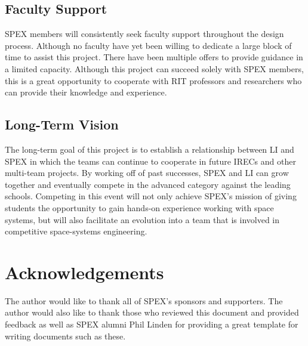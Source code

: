 \documentclass[conference]{IEEEtran} %
\begin{document}
\subsection{Faculty Support}
\label{subsec:Faculty Support}
SPEX members will consistently seek faculty support throughout the design process. Although no faculty have yet been willing to dedicate a
large block of time to assist this project. There have been multiple offers to provide guidance in a limited capacity. Although this project can succeed solely
with SPEX members, this is a great opportunity to cooperate with RIT professors and researchers who can provide their knowledge and experience.

\subsection{Long-Term Vision}
\label{sec:Long-Term Vision}
The long-term goal of this project is to establish a relationship between LI and SPEX in which the teams can continue to cooperate
in future IRECs and other multi-team projects. By working off of past successes, SPEX and LI can grow together and eventually compete in the
advanced category against the leading schools. Competing in this event will not only achieve SPEX's mission of giving students the opportunity to gain hands-on
experience working with space systems, but will also facilitate an evolution into a team that is involved in competitive space-systems engineering.

\section*{Acknowledgements}
\label{subsec:Acknoledgements}
The author would like to thank all of SPEX's sponsors and supporters. The author would also like to thank those who reviewed this document and provided feedback
as well as SPEX alumni Phil Linden for providing a great template for writing documents such as these.
\onecolumn
\appendices{}
\end{document}
